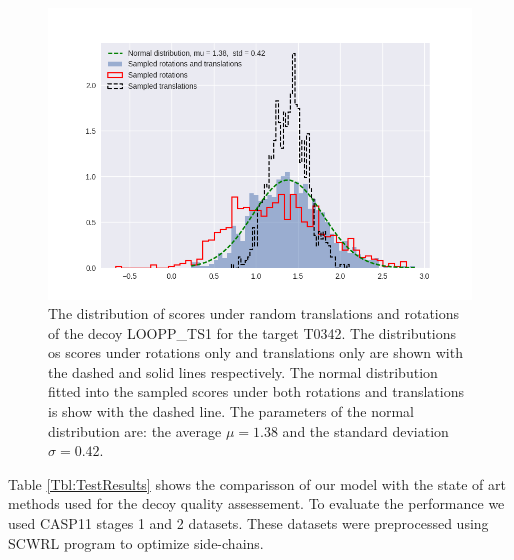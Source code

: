 \documentclass[a4paper,10pt]{article}
\begin{document}
\begin{figure}[H]
    \centering
    \includegraphics[width=\linewidth]{Fig/sampling_dist.png}
    \caption{The distribution of scores under random translations and rotations of the decoy LOOPP\_TS1 for the target T0342. The distributions 
    os scores under rotations only and translations only are shown with the dashed and solid lines respectively.
    The normal distribution fitted into the sampled scores under both rotations and translations is show with the dashed line. 
    The parameters of the normal distribution are: the average $\mu = 1.38$ and the standard deviation $\sigma = 0.42$.}
    \label{Fig:ScoreDistribution}
\end{figure}


Table \ref{Tbl:TestResults} shows the comparisson of our model with the state of art methods used for the decoy quality assessement. 
To evaluate the performance we used CASP11 stages 1 and 2 datasets. 
These datasets were preprocessed using SCWRL program to optimize side-chains. 
\end{document}
